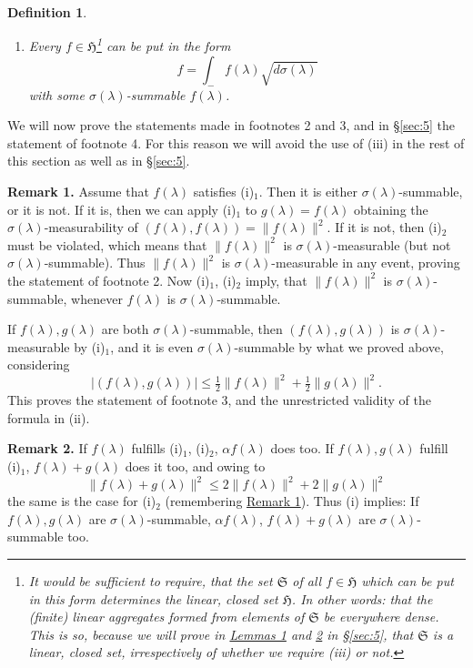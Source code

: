 \documentclass[b5paper,12pt,twoside]{article}
\numberwithin{equation}{section}
\theoremstyle{vnplain}
\theoremstyle{vndefinition}
\newtheorem{definition}{Definition}
\newcommand{\secref}[1]{\hyperref[#1]{\S\ref*{#1}}}
\begin{document}
\begin{definition}
\begin{enumerate}[label=(\roman*)]
\[
f=\int_{-}f(\lambda)\sqrt{d\sigma(\lambda)},\qquad
g=\int_{-}g(\lambda)\sqrt{d\sigma(\lambda)}
\]
(observe $f,g\in\mathfrak H$):
\[
(f,g)=\int(f(\lambda),g(\lambda))\,d\sigma(\lambda).
\]
\item Every $f\in\mathfrak H$\footnote{It would be sufficient to require,
that the set $\mathfrak S$ of all $f\in\mathfrak H$ which can be put in this
form determines the linear, closed set $\mathfrak H$. In other words: that the
(finite) linear aggregates formed from elements of $\mathfrak S$ be everywhere
dense. This is so, because we will prove in \hyperref[lem:1]{Lemmas 1} and
\hyperref[lem:2]{2} in \secref{sec:5},
that $\mathfrak S$ is a linear, closed set, irrespectively of whether we require
(iii) or not.} can be put in the form
\[
f=\int_{-}f(\lambda)\sqrt{d\sigma(\lambda)}
\]
with some $\sigma(\lambda)$-summable $f(\lambda)$.
\end{enumerate}
\end{definition}

We will now prove the statements made in footnotes 2 and 3, and in
\secref{sec:5} the statement of footnote 4. For this reason we will avoid the use
of (iii) in the rest of this section as well as in \secref{sec:5}.

\medskip\noindent{}\label{rem:3.1}\textbf{Remark 1.}
Assume that $f(\lambda)$ satisfies (i)$_1$. Then it is either
$\sigma(\lambda)$-summable, or it is not. If it is, then we can apply (i)$_1$ to
$g(\lambda)=f(\lambda)$ obtaining the $\sigma(\lambda)$-measurability of
$(f(\lambda),f(\lambda))=\lVert f(\lambda)\rVert^2$. If it is not, then
(i)$_2$ must be violated, which means that $\lVert f(\lambda)\rVert^2$ is
$\sigma(\lambda)$-measurable (but not $\sigma(\lambda)$-summable). Thus
$\lVert f(\lambda)\rVert^2$ is $\sigma(\lambda)$-measurable in any event,
proving the statement of footnote 2. Now (i)$_1$, (i)$_2$ imply, that
$\lVert f(\lambda)\rVert^2$ is $\sigma(\lambda)$-summable, whenever
$f(\lambda)$ is $\sigma(\lambda)$-summable.

If $f(\lambda),g(\lambda)$ are both $\sigma(\lambda)$-summable, then
$(f(\lambda),g(\lambda))$ is $\sigma(\lambda)$-measurable by (i)$_1$, and it
is even $\sigma(\lambda)$-summable by what we proved above, considering
\[
|(f(\lambda),g(\lambda))|
 \leq\tfrac12\lVert f(\lambda)\rVert^2
      +\tfrac12\lVert g(\lambda)\rVert^2.
\]
This proves the statement of footnote 3, and the unrestricted validity of the
formula in (ii).

\medskip\noindent{}\label{rem:3.2}\textbf{Remark 2.}
If $f(\lambda)$ fulfills (i)$_1$, (i)$_2$, $\alpha f(\lambda)$ does too. If
$f(\lambda),g(\lambda)$ fulfill (i)$_1$, $f(\lambda)+g(\lambda)$ does it too,
and owing to
\[
\lVert f(\lambda)+g(\lambda)\rVert^2
 \leq2\lVert f(\lambda)\rVert^2+2\lVert g(\lambda)\rVert^2
\]
the same is the case for (i)$_2$ (remembering
\hyperref[rem:3.1]{Remark 1}). Thus (i) implies:
If $f(\lambda),g(\lambda)$ are $\sigma(\lambda)$-summable,
$\alpha f(\lambda)$, $f(\lambda)+g(\lambda)$ are
$\sigma(\lambda)$-summable too.
\end{document}
